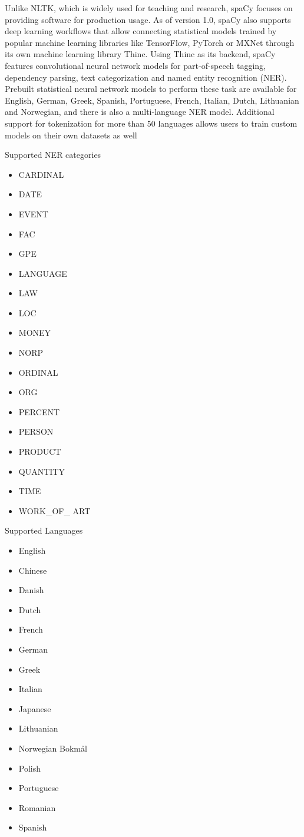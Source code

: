 \documentclass[conference]{IEEEtran}
\begin{document}
Unlike NLTK, which is widely used for teaching and research, spaCy focuses on providing software for production usage. As of version 1.0, spaCy also supports deep learning workflows that allow connecting statistical models trained by popular machine learning libraries like TensorFlow, PyTorch or MXNet through its own machine learning library Thinc. Using Thinc as its backend, spaCy features convolutional neural network models for part-of-speech tagging, dependency parsing, text categorization and named entity recognition (NER). Prebuilt statistical neural network models to perform these task are available for English, German, Greek, Spanish, Portuguese, French, Italian, Dutch, Lithuanian and Norwegian, and there is also a multi-language NER model. Additional support for tokenization for more than 50 languages allows users to train custom models on their own datasets as well

Supported NER categories

\begin{itemize}
	\item CARDINAL
	\item DATE
	\item EVENT
	\item FAC
	\item GPE
	\item LANGUAGE
	\item LAW
	\item LOC
	\item MONEY
	\item NORP
	\item ORDINAL
	\item ORG
	\item PERCENT
	\item PERSON
	\item PRODUCT
	\item QUANTITY
	\item TIME
	\item WORK\_OF\_ ART
\end{itemize}

Supported Languages

\begin{itemize}
	\item English
	\item Chinese
	\item Danish
	\item Dutch
	\item French
	\item German
	\item Greek
	\item Italian
	\item Japanese
	\item Lithuanian
	\item Norwegian Bokmål
	\item Polish
	\item Portuguese
	\item Romanian
	\item Spanish
\end{itemize}
\end{document}

